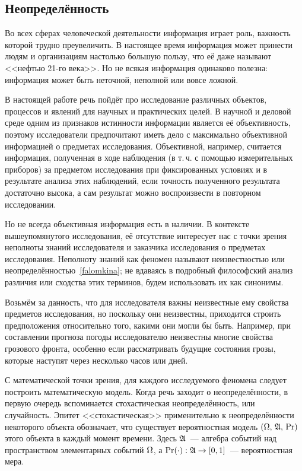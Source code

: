 
\subsection{Неопределённость}
\label{sec:intro_uncertainty}

Во всех сферах человеческой деятельности информация играет роль, важность которой трудно преувеличить. В настоящее время информация  может принести людям и организациям настолько большую пользу, что её даже называют <<нефтью 21-го века>>. Но не всякая информация одинаково полезна: информация может быть неточной, неполной или вовсе ложной.  

В настоящей работе речь пойдёт про исследование различных объектов, процессов и явлений для научных и практических целей. В научной и деловой среде одним из признаков истинности информации является её объективность, поэтому исследователи предпочитают иметь дело с максимально объективной информацией о предметах исследования.  Объективной, например, считается информация, полученная в ходе наблюдения (в т.\,ч. с помощью измерительных приборов) за предметом исследования при фиксированных условиях и в результате анализа этих наблюдений, если точность полученного результата достаточно высока, а сам результат можно воспроизвести в повторном исследовании. 
  
Но не всегда объективная информация есть в наличии. В контексте вышеупомянутого исследования, её отсутствие интересует нас с точки зрения неполноты знаний исследователя и заказчика исследования о предметах исследования. Неполноту знаний как феномен называют неизвестностью или неопределённостью~\ref{falomkina}; не вдаваясь в подробный философский анализ различия или сходства этих терминов, будем использовать их как синонимы.  

Возьмём за данность, что для исследователя важны неизвестные ему свойства предметов исследования, но поскольку они неизвестны, приходится строить предположения относительно того, какими они могли бы быть. Например, при составлении прогноза погоды исследователю неизвестны многие свойства грозового фронта, особенно если рассматривать будущие состояния грозы, которые наступят через несколько часов или дней.

С математической точки зрения, для каждого исследуемого феномена следует построить математическую модель.  Когда речь заходит о неопределённости, в первую очередь вспоминается стохастическая неопределённость, или случайность. Эпитет <<стохастическая>> применительно к неопределённости некоторого объекта обозначает, что существует вероятностная модель ${(\Omega,\,{\mathfrak{A}},\,{\mathrm{Pr}})}$ этого объекта в каждый момент времени. Здесь ${\mathfrak{A}}$~--- алгебра событий над пространством элементарных событий $\Omega$, а ${\mathrm{Pr}}(\cdot): {\mathfrak{A}} \to [0,1]$~--- вероятностная мера. 

